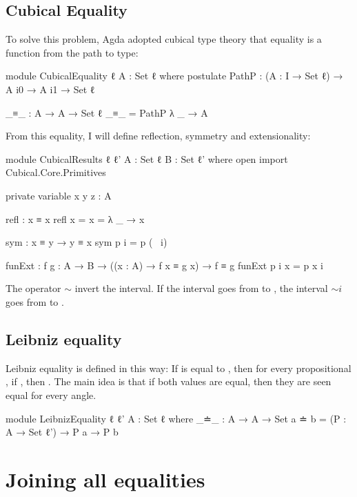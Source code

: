 \documentclass{article}
\begin{document}
\subsection{Cubical Equality}

To solve this problem, Agda adopted cubical type theory that equality is a function from the path to type:

\begin{code}
module CubicalEquality {ℓ} {A : Set ℓ} where
  postulate
    PathP : (A : I → Set ℓ) → A i0 → A i1 → Set ℓ

  _≡_ : A → A → Set ℓ
  _≡_ = PathP λ _ → A
\end{code}

From this equality, I will define reflection, symmetry and extensionality:

\begin{code}
module CubicalResults {ℓ ℓ'} {A : Set ℓ} {B : Set ℓ'} where
  open import Cubical.Core.Primitives

  private variable
    x y z : A

  refl : x ≡ x
  refl {x = x} = λ _ → x

  sym : x ≡ y → y ≡ x
  sym p i = p (~ i)

  funExt : {f g : A → B}
    → ((x : A) → f x ≡ g x) → f ≡ g
  funExt p i x = p x i
\end{code}

The operator $\sim$ invert the interval. If the interval  goes from
 to , the interval $\sim i$ goes from  to .

\subsection{Leibniz equality}

Leibniz equality is defined in this way:
If  is equal to , then for every propositional , if ,
then .
The main idea is that if both values are equal, then they are seen equal for every angle.

\begin{code}
module LeibnizEquality {ℓ} {ℓ'} {A : Set ℓ} where
  _≐_ : A → A → Set
  a ≐ b = (P : A → Set ℓ') → P a → P b
\end{code}

\section{Joining all equalities}
\end{document}
